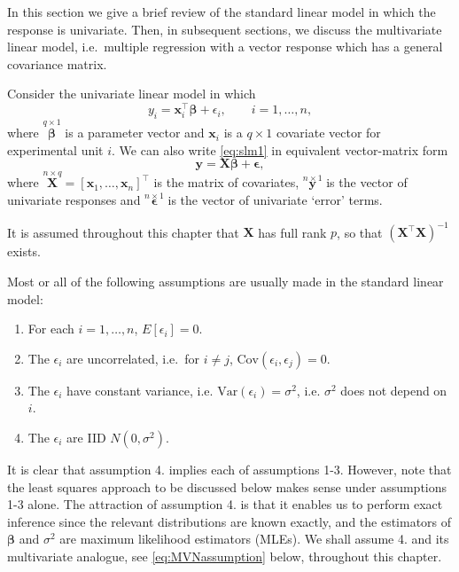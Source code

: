 \documentclass[]{book}
\theoremstyle{definition}
\theoremstyle{definition}
\theoremstyle{definition}
\theoremstyle{remark}
\begin{document}
In this section we give a brief review of the standard linear model in which the response is univariate. Then, in subsequent sections, we discuss the multivariate linear model, i.e.~multiple regression with a vector response which has a general covariance matrix.

Consider the univariate linear model in which
\begin{equation}
y_i = \boldsymbol x_i^\top \boldsymbol \beta+\epsilon_i, \qquad i=1, \ldots , n,
\label{eq:slm1}
\end{equation}
where \(\stackrel{q \times 1}{\boldsymbol \beta}\) is a parameter vector and \(\boldsymbol x_i\) is a \(q \times 1\) covariate vector for experimental unit \(i\). We can also write \eqref{eq:slm1} in equivalent vector-matrix form
\begin{equation}
\boldsymbol y=\boldsymbol X\boldsymbol \beta+{\pmb \epsilon},
\label{eq:slm2}
\end{equation}
where \(\stackrel{n \times q}{\boldsymbol X}=[\boldsymbol x_1 , \ldots , \boldsymbol x_n]^\top\) is the matrix of covariates,
\(\stackrel{n \times 1}{\boldsymbol y}\) is the vector of univariate responses and \(\stackrel{n \times 1}{\pmb \epsilon}\) is the vector of univariate `error' terms.

It is assumed throughout this chapter that \(\boldsymbol X\) has full rank \(p\), so that \((\boldsymbol X^\top \boldsymbol X)^{-1}\) exists.

Most or all of the following assumptions are usually made in the standard linear model:

\begin{enumerate}
\def\labelenumi{\arabic{enumi}.}
\item
  For each \(i=1, \ldots , n\), \(E[\epsilon_i]=0\).
\item
  The \(\epsilon_i\) are uncorrelated, i.e.~for \(i \neq j\), \(\text{Cov}(\epsilon_i, \epsilon_j)=0\).
\item
  The \(\epsilon_i\) have constant variance, i.e. \(\text{Var}(\epsilon_i)=\sigma^2\), i.e. \(\sigma^2\) does not depend on \(i\).
\item
  The \(\epsilon_i\) are IID \(N(0, \sigma^2)\).
\end{enumerate}

It is clear that assumption 4. implies each of assumptions 1-3. However, note that the least squares approach to be discussed below makes sense under assumptions 1-3 alone. The attraction of assumption 4. is that it enables us to perform exact inference since the relevant distributions are known exactly, and the estimators of \(\boldsymbol \beta\) and \(\sigma^2\) are maximum likelihood estimators (MLEs). We shall assume 4. and its multivariate analogue, see \eqref{eq:MVNassumption} below, throughout this chapter.
\end{document}
